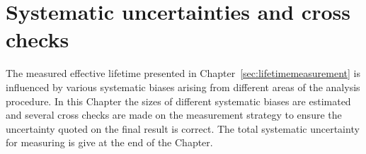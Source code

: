 \chapter{Systematic uncertainties and cross checks}
\label{sec:systematics}
The measured \bsmumu effective lifetime presented in Chapter~\ref{sec:lifetimemeasurement} is influenced by various systematic biases arising from different areas of the analysis procedure. In this Chapter the sizes of different systematic biases are estimated and several cross checks are made on the measurement strategy to ensure the uncertainty quoted on the final result is correct. The total systematic uncertainty for measuring \tmumu is give at the end of the Chapter.


